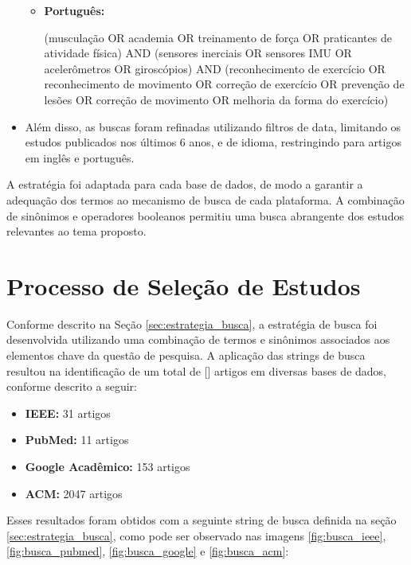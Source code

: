 \documentclass[a4paper,12pt]{article}
\begin{document}
\begin{itemize}
\begin{itemize}
        \item \textbf{Português:} 
        \begin{RaggedRight}
        (musculação OR academia OR treinamento de força OR praticantes de atividade física) AND (sensores inerciais OR sensores IMU OR acelerômetros OR giroscópios) AND (reconhecimento de exercício OR reconhecimento de movimento OR correção de exercício OR prevenção de lesões OR correção de movimento OR melhoria da forma do exercício)
        \end{RaggedRight}
    \end{itemize}
    
    \item Além disso, as buscas foram refinadas utilizando filtros de data, limitando os estudos publicados nos últimos 6 anos, e de idioma, restringindo para artigos em inglês e português.
\end{itemize}

A estratégia foi adaptada para cada base de dados, de modo a garantir a adequação dos termos ao mecanismo de busca de cada plataforma. A combinação de sinônimos e operadores booleanos permitiu uma busca abrangente dos estudos relevantes ao tema proposto.

\section{Processo de Seleção de Estudos}

Conforme descrito na Seção \ref{sec:estrategia_busca}, a estratégia de busca foi desenvolvida utilizando uma combinação de termos e sinônimos associados aos elementos chave da questão de pesquisa. 
A aplicação das strings de busca resultou na identificação de um total de [] artigos em diversas bases de dados, conforme descrito a seguir:

\begin{itemize}
    \item \textbf{IEEE:} 31 artigos
    \item \textbf{PubMed:} 11 artigos
    \item \textbf{Google Acadêmico:} 153 artigos
    \item \textbf{ACM:} 2047 artigos
\end{itemize}

Esses resultados foram obtidos com a seguinte string de busca definida na seção \ref{sec:estrategia_busca}, como pode ser observado nas imagens \ref{fig:busca_ieee}, \ref{fig:busca_pubmed}, \ref{fig:busca_google} e \ref{fig:busca_acm}:
\end{document}
